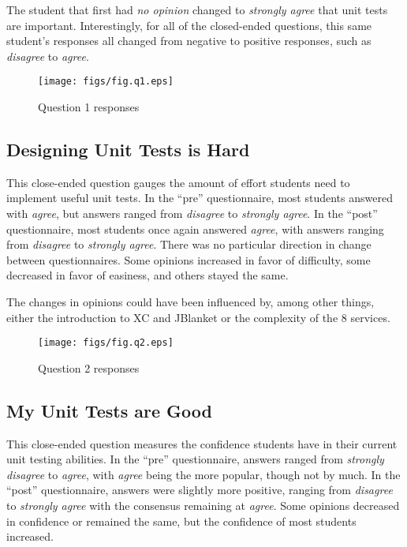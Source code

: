 The student that first had {\sl no opinion} changed to {\sl strongly agree}
that unit tests are important.  Interestingly, for all of the closed-ended
questions, this same student's responses all changed from negative to
positive responses, such as {\sl disagree} to {\sl agree}.

\begin{figure}[htbp]
  \centering
  \texttt{[image: figs/fig.q1.eps]}
  \caption{Question 1 responses}
  \label{fig:q1}
\end{figure}

\subsection{Designing Unit Tests is Hard}
This close-ended question gauges the amount of effort students need to
implement useful unit tests.  In the ``pre'' questionnaire, most students
answered with {\sl agree}, but answers ranged from {\sl disagree} to {\sl
strongly agree}.  In the ``post'' questionnaire, most students once again
answered {\sl agree}, with answers ranging from {\sl disagree} to {\sl
strongly agree}.  There was no particular direction in change between
questionnaires.  Some opinions increased in favor of difficulty, some
decreased in favor of easiness, and others stayed the same.

The changes in opinions could have been influenced by, among other things,
either the introduction to XC and JBlanket or the complexity of the 8
services.

\begin{figure}[htbp]
  \centering
  \texttt{[image: figs/fig.q2.eps]}
  \caption{Question 2 responses}
  \label{fig:q2}
\end{figure}

\subsection{My Unit Tests are Good}
This close-ended question measures the confidence students have in their
current unit testing abilities.  In the ``pre'' questionnaire, answers
ranged from {\sl strongly disagree} to {\sl agree}, with {\sl agree} being
the more popular, though not by much.  In the ``post'' questionnaire,
answers were slightly more positive, ranging from {\sl disagree} to {\sl
strongly agree} with the consensus remaining at {\sl agree}.  Some opinions
decreased in confidence or remained the same, but the confidence of most
students increased.

